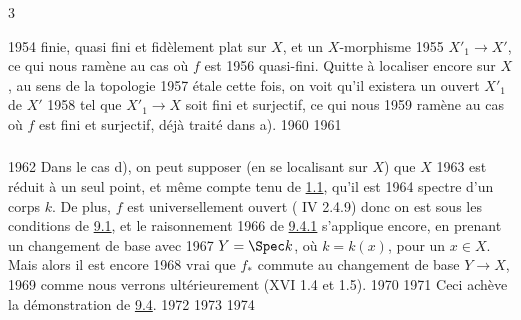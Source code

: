 3	\documentclass[10pt]{../fichiers-configuration-latex/smfart}
\begin{document}
  1954	finie, quasi fini et fidèlement plat sur $X$, et un $X$-morphisme
  1955	$X'_{1}\rightarrow X'$, ce qui nous ramène au cas où $f$ est
  1956	quasi-fini. Quitte à localiser encore sur $X$, au sens de la topologie
  1957	étale cette fois, on voit qu'il existera un ouvert $X'_{1}$ de $X'$
  1958	tel que $X'_{1}\rightarrow X$ soit fini et surjectif, ce qui nous
  1959	ramène au cas où $f$ est fini et surjectif, déjà traité dans a).
  1960	
  1961	\subsubsection{}
  1962	Dans le cas d), on peut supposer (en se localisant sur $X$) que $X$
  1963	est réduit à un seul point, et même compte tenu de \hyperref[VIII.thm1.1]{1.1}, qu'il est
  1964	spectre d'un corps $k$. De plus, $f$ est universellement ouvert (	IV 2.4.9) donc on est sous les conditions de \hyperref[VIII.prop9.1]{9.1}, et le raisonnement
  1966	de \hyperref[VIII.subsubsec9.4.1]{9.4.1} s'applique encore, en prenant un changement de base avec
  1967	$Y=\Spec k$, où $k=k(x)$, pour un $x\in X$. Mais alors il est encore
  1968	vrai que $f_{\ast}$ commute au changement de base $Y\rightarrow X$,
  1969	comme nous verrons ultérieurement (XVI 1.4 et 1.5).
  1970	
  1971	Ceci achève la démonstration de \hyperref[VIII.thm9.4]{9.4}.
  1972	
  1973	
  1974	\ifx\danslelivre{}	
\end{document}
